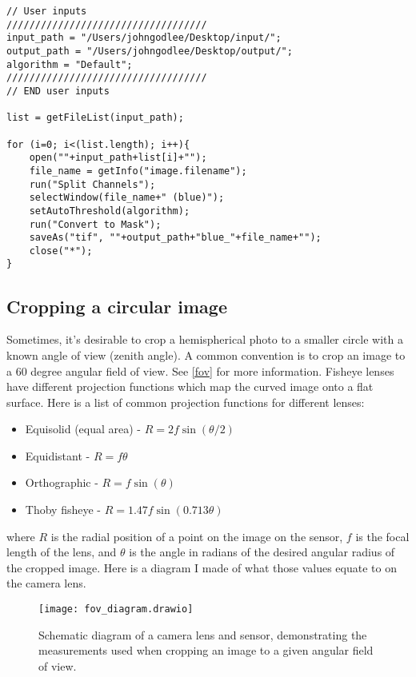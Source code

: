 \documentclass{article}
\newcommand\file[1]{\texttt{\underline{#1}}}
\begin{document}
\begin{minipage}{\linewidth}
\begin{lstlisting}[label=binarize_blue_channel, caption=ImageJ macro to binarize images by the blue colour channel. The macro can also be found in \file{binarize\_blue\_channel.ijm}.]
// User inputs
///////////////////////////////////
input_path = "/Users/johngodlee/Desktop/input/";
output_path = "/Users/johngodlee/Desktop/output/";
algorithm = "Default";
///////////////////////////////////
// END user inputs

list = getFileList(input_path);

for (i=0; i<(list.length); i++){
	open(""+input_path+list[i]+"");
	file_name = getInfo("image.filename");
	run("Split Channels");
	selectWindow(file_name+" (blue)");
	setAutoThreshold(algorithm);
	run("Convert to Mask");
	saveAs("tif", ""+output_path+"blue_"+file_name+"");
	close("*");
}
\end{lstlisting}
\end{minipage}

\subsection{Cropping a circular image} \label{circle}

Sometimes, it's desirable to crop a hemispherical photo to a smaller circle with a known angle of view (zenith angle). A common convention is to crop an image to a 60 degree angular field of view. See \autoref{fov} for more information. Fisheye lenses have different projection functions which map the curved image onto a flat surface. Here is a list of common projection functions for different lenses:

\begin{itemize}
	\item{Equisolid (equal area) - $R = 2f\sin{(\theta/2)}$}
	\item{Equidistant - $R = f\theta$}
	\item{Orthographic - $R = f\sin{(\theta)}$}
	\item{Thoby fisheye - $R = 1.47f\sin{(0.713\theta)}$}
\end{itemize}

where $R$ is the radial position of a point on the image on the sensor, $f$ is the focal length of the lens, and $\theta$ is the angle in radians of the desired angular radius of the cropped image. Here is a diagram I made of what those values equate to on the camera lens.

\begin{figure}[H]
\centering
	\texttt{[image: fov\_diagram.drawio]}
	\caption{Schematic diagram of a camera lens and sensor, demonstrating the measurements used when cropping an image to a given angular field of view.}
	\label{fov_diagram}
\end{figure}
\end{document}
